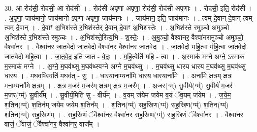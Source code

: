 \documentclass[17pt]{extarticle}
\begin{document}
30. आ रोद॑सी॒ रोद॑सी॒ आ रोद॑सी । . रोद॑सी अपृणा अपृणा॒ रोद॑सी॒ रोद॑सी अपृणाः । . रोद॑सी॒ इति॒ रोद॑सी । . अ॒पृ॒णा॒ जाय॑मानो॒ जाय॑मानो ऽपृणा अपृणा॒ जाय॑मानः । . जाय॑मान॒ इति॒ जाय॑मानः । . त्वम् दे॒वान् दे॒वान् त्वम् त्वम् दे॒वान् । . दे॒वाꣳ अ॒भिश॑स्ते र॒भिश॑स्तेर् दे॒वान् दे॒वाꣳ अ॒भिश॑स्तेः । . अ॒भिश॑स्ते रमुञ्चो अमुञ्चो अ॒भिश॑स्ते र॒भिश॑स्ते रमुञ्चः । . अ॒भिश॑स्ते॒रित्य॒भि - श॒स्तेः॒ । . अ॒मु॒ञ्चो॒ वैश्वा॑नर॒ वैश्वा॑नरामुञ्चो अमुञ्चो॒ वैश्वा॑नर । . वैश्वा॑नर जातवेदो जातवेदो॒ वैश्वा॑नर॒ वैश्वा॑नर जातवेदः । . जा॒त॒वे॒दो॒ म॒हि॒त्वा म॑हि॒त्वा जा॑तवेदो जातवेदो महि॒त्वा । . जा॒त॒वे॒द॒ इति॑ जात - वे॒दः॒ । . म॒हि॒त्वेति॑ महि - त्वा । . अ॒स्माक॑ मग्ने अग्ने॒ ऽस्माक॑ म॒स्माक॑ मग्ने । . अ॒ग्ने॒ म॒घव॑थ्सु म॒घव॑थ्स्वग्ने अग्ने म॒घव॑थ्सु । . म॒घव॑थ्सु धारय धारय म॒घव॑थ्सु म॒घव॑थ्सु धारय । . म॒घव॒थ्स्विति॑ म॒घव॑त् - सु॒ । . धा॒र॒याना॒म्यना॑मि धारय धार॒याना॑मि । . अना॑मि क्ष॒त्रम् क्ष॒त्र मना॒म्यना॑मि क्ष॒त्रम् । . क्ष॒त्र म॒जर॑ म॒जर॑म् क्ष॒त्रम् क्ष॒त्र म॒जर᳚म् । . अ॒जर(ग्म्॑) सु॒वीर्य(ग्म्॑) सु॒वीर्य॑ म॒जर॑ म॒जर(ग्म्॑) सु॒वीर्य᳚म् । . सु॒वीर्य॒मिति॑ सु - वीर्य᳚म् । . व॒यम् ज॑येम जयेम व॒यं ॅव॒यम् ज॑येम । . ज॒ये॒म॒ श॒तिन(ग्म्॑) श॒तिन॑म् जयेम जयेम श॒तिन᳚म् । . श॒तिन(ग्म्॑) सह॒स्रिण(ग्म्॑) सह॒स्रिण(ग्म्॑) श॒तिन(ग्म्॑) श॒तिन(ग्म्॑) सह॒स्रिण᳚म् । . स॒ह॒स्रिणं॒ ॅवैश्वा॑नर॒ वैश्वा॑नर सह॒स्रिण(ग्म्॑) सह॒स्रिणं॒ ॅवैश्वा॑नर । . वैश्वा॑नर॒ वाजं॒ ॅवाजं॒ ॅवैश्वा॑नर॒ वैश्वा॑नर॒ वाज᳚म् । \newline
\end{document}
